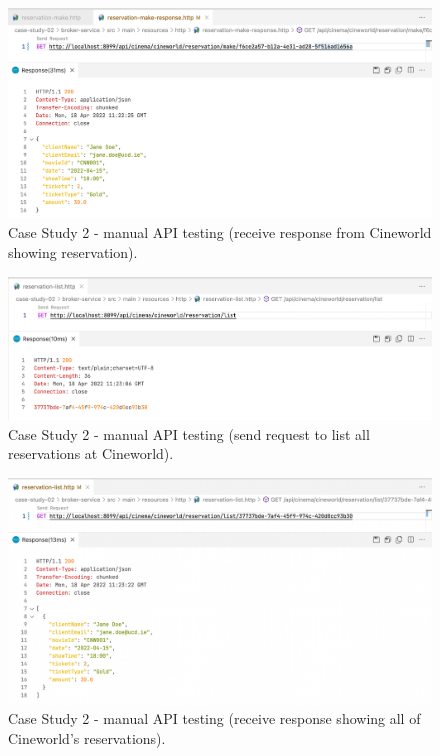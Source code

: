 \begin{figure}[H]
  \centering
  \includegraphics[width=1.0\linewidth]{./assets/images/case-studies/cs02-manual-4.png}
  \caption{Case Study 2 - manual API testing (receive response from Cineworld showing reservation).}
  \label{fig:cs02-manual-4}
\end{figure}

\begin{figure}[H]
  \centering
  \includegraphics[width=1.0\linewidth]{./assets/images/case-studies/cs02-manual-5.png}
  \caption{Case Study 2 - manual API testing (send request to list all reservations at Cineworld).}
  \label{fig:cs02-manual-5}
\end{figure}

\begin{figure}[H]
  \centering
  \includegraphics[width=1.0\linewidth]{./assets/images/case-studies/cs02-manual-6.png}
  \caption{Case Study 2 - manual API testing (receive response showing all of Cineworld's reservations).}
  \label{fig:cs02-manual-6}
\end{figure}







